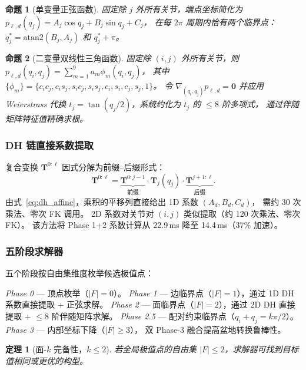 \documentclass[journal]{IEEEtran}
\newtheorem{theorem}{定理}
\newtheorem{proposition}{命题}
\newcommand{\bT}{\mathbf{T}}
\begin{document}
\begin{proposition}[单变量正弦函数]\label{prop:sinusoid}
固定除 $j$ 外所有关节，端点坐标简化为
$p_{\ell,d}(q_j) = A_j\cos q_j + B_j\sin q_j + C_j$，
在每 $2\pi$ 周期内恰有两个临界点：
$q_j^* = \mathrm{atan2}(B_j, A_j)$ 和 $q_j^* + \pi$。
\end{proposition}

\begin{proposition}[二变量双线性三角函数]\label{prop:bilinear}
固定除 $(i,j)$ 外所有关节，则
$p_{\ell,d}(q_i, q_j) = \sum_{m=1}^{9} a_m \phi_m(q_i, q_j)$，
其中 $\{\phi_m\} = \{c_i c_j, c_i s_j, s_i c_j, s_i s_j, c_i, s_i, c_j, s_j, 1\}$。
令 $\nabla_{(q_i,q_j)} p_{\ell,d} = \bm{0}$ 并应用 Weierstrass 代换
$t_j = \tan(q_j/2)$，系统约化为 $t_j$ 的 $\leq 8$ 阶多项式，
通过伴随矩阵特征值精确求根。
\end{proposition}

\subsubsection{DH 链直接系数提取}

复合变换 $\bT^{0:\ell}$ 因式分解为前缀--后缀形式：
\begin{equation}\label{eq:prefix_suffix}
  \bT^{0:\ell} = \underbrace{\bT^{0:j-1}}_\text{前缀}
  \cdot \bT_j(q_j) \cdot \underbrace{\bT^{j+1:\ell}}_\text{后缀}.
\end{equation}
由式~\eqref{eq:dh_affine}，乘积的平移列直接给出 1D 系数 $(A_d, B_d, C_d)$，
需约 30 次乘法、零次 FK 调用。
2D 系数对关节对 $(i,j)$ 类似提取（约 120 次乘法、零次 FK）。
该方法将 Phase 1+2 系数计算从 22.9\,ms 降至 14.4\,ms（$37\%$ 加速）。

\subsubsection{五阶段求解器}

五个阶段按自由集维度枚举候选极值点：

\emph{Phase 0} --- 顶点枚举（$|F|=0$）。
\emph{Phase 1} --- 边临界点（$|F|=1$），通过 1D DH 系数直接提取 + 正弦求解。
\emph{Phase 2} --- 面临界点（$|F|=2$），通过 2D DH 直接提取 + $\leq 8$ 阶伴随矩阵求解。
\emph{Phase 2.5} --- 配对约束临界点（$q_i + q_j = k\pi/2$）。
\emph{Phase 3} --- 内部坐标下降（$|F|\geq 3$），
双 Phase-3 融合提高盆地转换鲁棒性。

\begin{theorem}[面-$k$ 完备性，$k \leq 2$]\label{thm:face}
若全局极值点的自由集 $|F|\leq 2$，求解器可找到目标值相同或更优的构型。
\end{theorem}
\end{document}
